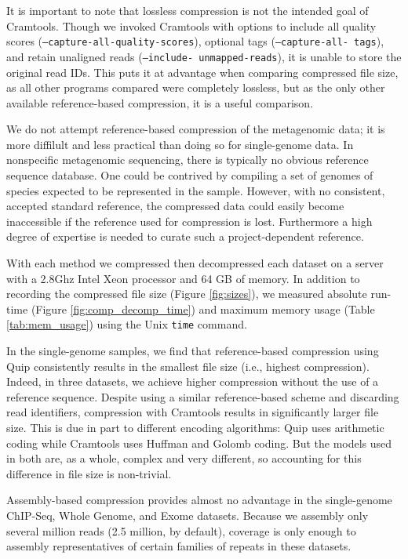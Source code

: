 \documentclass[twocolumn]{article}
\begin{document}
It is important to note that lossless compression is not the intended goal of
Cramtools. Though we invoked Cramtools with options to include all quality
scores (\texttt{--capture-all-quality-scores}), optional tags (\texttt
{--capture-all- tags}), and retain unaligned reads (\texttt{--include-
unmapped-reads}), it is unable to store the original read IDs. This puts it at
advantage when comparing compressed file size, as all other programs compared
were completely lossless, but as the only other available reference-based
compression, it is a useful comparison.



We do not attempt reference-based compression of the metagenomic data; it is
more diffilult and less practical than doing so for single-genome data. In
nonspecific metagenomic sequencing, there is typically no obvious reference
sequence database. One could be contrived by compiling a set of genomes of
species expected to be represented in the sample. However, with no consistent,
accepted standard reference, the compressed data could easily become
inaccessible if the reference used for compression is lost. Furthermore a high
degree of expertise is needed to curate such a project-dependent reference.


With each method we compressed then decompressed each dataset on a server with
a 2.8Ghz Intel Xeon processor and 64 GB of memory. In addition to recording
the compressed file size (Figure \ref{fig:sizes}), we measured absolute run-
time (Figure \ref{fig:comp_decomp_time}) and maximum memory usage (Table
\ref{tab:mem_usage}) using the Unix \texttt{time} command.

In the single-genome samples, we find that reference-based compression using
Quip consistently results in the smallest file size (i.e., highest
compression). Indeed, in three datasets, we achieve higher compression without
the use of a reference sequence. Despite using a similar reference-based
scheme and discarding read identifiers, compression with Cramtools results in
significantly larger file size. This is due in part to different encoding
algorithms: Quip uses arithmetic coding while Cramtools uses Huffman and
Golomb coding. But the models used in both are, as a whole, complex and very
different, so accounting for this difference in file size is non-trivial.

Assembly-based compression provides almost no advantage in the single-genome
ChIP-Seq, Whole Genome, and Exome datasets. Because we assembly only several
million reads (2.5 million, by default), coverage is only enough to assembly
representatives of certain families of repeats in these datasets.
\end{document}
